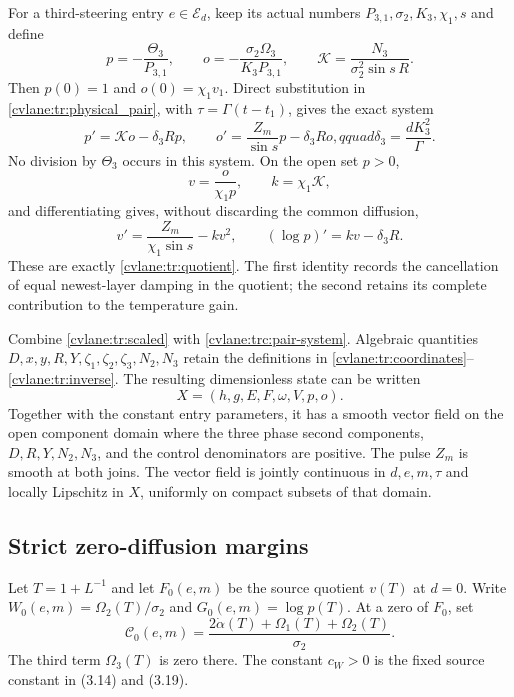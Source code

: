 For a third-steering entry $e\in\mathcal E_d$, keep its actual numbers
$P_{3,1},\sigma_2,K_3,\chi_1,s$ and define
\begin{equation}\label{cvlane:trc:pair-coordinates}
 p=-\frac{\Theta_3}{P_{3,1}},\qquad
 o=-\frac{\sigma_2\Omega_3}{K_3P_{3,1}},\qquad
 \mathcal K=\frac{N_3}{\sigma_2^2\sin s\,R}.
\end{equation}
Then $p(0)=1$ and $o(0)=\chi_1v_1$.  Direct substitution in
\eqref{cvlane:tr:physical_pair}, with $\tau=\Gamma(t-t_1)$, gives the exact system
\begin{equation}\label{cvlane:trc:pair-system}
 p'=\mathcal K o-\delta_3Rp,\qquad
 o'=\frac{Z_m}{\sin s}p-\delta_3Ro,qquad
 \delta_3=\frac{dK_3^2}{\Gamma}.
\end{equation}
No division by $\Theta_3$ occurs in this system.  On the open set $p>0$,
\begin{equation}\label{cvlane:trc:quotient-map}
 v=\frac{o}{\chi_1p},\qquad k=\chi_1\mathcal K,
\end{equation}
and differentiating gives, without discarding the common diffusion,
\begin{equation}\label{cvlane:trc:quotient-check}
 v'=\frac{Z_m}{\chi_1\sin s}-kv^2,\qquad
 (\log p)'=kv-\delta_3R.
\end{equation}
These are exactly \eqref{cvlane:tr:quotient}.  The first identity records the
cancellation of equal newest-layer damping in the quotient; the second
retains its complete contribution to the temperature gain.

Combine \eqref{cvlane:tr:scaled} with \eqref{cvlane:trc:pair-system}.  Algebraic
quantities $D,x,y,R,Y,\zeta_1,\zeta_2,\zeta_3,N_2,N_3$ retain the definitions
in \eqref{cvlane:tr:coordinates}--\eqref{cvlane:tr:inverse}.  The resulting dimensionless
state can be written
\[
 X=(h,g,E,F,\omega,V,p,o).
\]
Together with the constant entry parameters, it has a smooth vector field
on the open component domain where the three phase second components,
$D,R,Y,N_2,N_3$, and the control denominators are positive.  The pulse
$Z_m$ is smooth at both joins.  The vector field is jointly continuous in
$d,e,m,\tau$ and locally Lipschitz in $X$, uniformly on compact subsets of
that domain.

\subsection{Strict zero-diffusion margins}

Let $T=1+L^{-1}$ and let $F_0(e,m)$ be the source quotient $v(T)$ at
$d=0$.  Write $W_0(e,m)=\Omega_2(T)/\sigma_2$ and
$G_0(e,m)=\log p(T)$.  At a zero of $F_0$, set
\[
 \mathcal C_0(e,m)=
 \frac{2\dot\alpha(T)+\Omega_1(T)+\Omega_2(T)}{\sigma_2}.
\]
The third term $\Omega_3(T)$ is zero there.  The constant $c_W>0$ is the
fixed source constant in (3.14) and (3.19).


